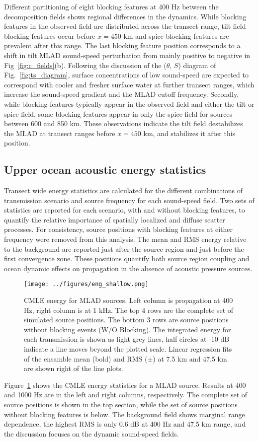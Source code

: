 \documentclass[preprint,NumberedRefs]{JASA}
\begin{document}
Different partitioning of eight blocking features at 400 Hz between the decomposition fields shows regional differences in the dynamics. While blocking features in the observed field are distributed across the transect range, tilt field blocking features occur before $x=450$ km and spice blocking features are prevalent after this range. The last blocking feature position corresponds to a shift in tilt MLAD sound-speed perturbation from mainly positive to negative in Fig~\ref{fig:c_fields}(b). Following the discussion of the ($\theta$, $S$) diagram of Fig.~\ref{fig:ts_diagram}, surface concentrations of low sound-speed are expected to correspond with cooler and fresher surface water at further transect ranges, which increase the sound-speed gradient and the MLAD cutoff frequency. Secondly, while blocking features typically appear in the observed field and either the tilt or spice field, some blocking features appear in only the spice field for sources between 600 and 850 km. These observations indicate the tilt field destabilizes the MLAD at transect ranges before $x=450$ km, and stabilizes it after this position.

\subsection{Upper ocean acoustic energy statistics}\label{ssec:energy}
Transect wide energy statistics are calculated for the different combinations of transmission scenario and source frequency for each sound-speed field. Two sets of statistics are reported for each scenario, with and without blocking features, to quantify the relative importance of spatially localized and diffuse scatter processes. For consistency, source positions with blocking features at either frequency were removed from this analysis. The mean and RMS energy relative to the background are reported just after the source region and just before the first convergence zone. These positions quantify both source region coupling and ocean dynamic effects on propagation in the absence of acoustic pressure sources.

\begin{figure}
\texttt{[image: ../figures/eng\_shallow.png]}
    \caption{CMLE energy for MLAD sources. Left column is propagation at 400 Hz, right column is at 1 kHz. The top 4 rows are the complete set of simulated source positions. The bottom 3 rows are source positions without blocking events (W/O Blocking). The integrated energy for each transmission is shown as light grey lines, half circles at -10 dB indicate a line moves beyond the plotted scale. Linear regression fits of the ensamble mean (bold) and RMS ($\pm$) at 7.5 km and 47.5 km are shown right of the line plots.}
    \label{fig:shal_eng}
\end{figure}
Figure~\ref{fig:shal_eng} shows the CMLE energy statistics for a MLAD source. Results at 400 and 1000 Hz are in the left and right columns, respectively. The complete set of source positions is shown in the top section, while the set of source positions without blocking features is below. The background field shows marginal range dependence, the highest RMS is only 0.6 dB at 400 Hz and 47.5 km range, and the discussion focuses on the dynamic sound-speed fields.
\end{document}
